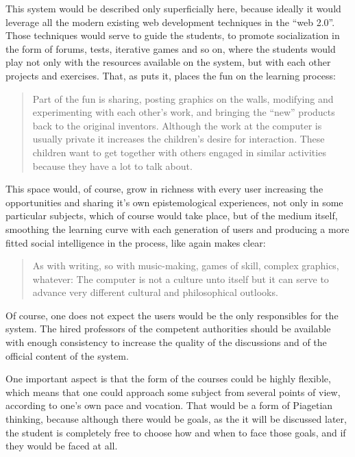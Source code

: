 This system would be described only superficially here, because ideally it would
leverage all the modern existing web development techniques in the ``web 2.0''.
Those techniques would serve to guide the students, to promote socialization in
the form of forums, tests, iterative games and so on, where the students would
play not only with the resources available on the system, but with each other
projects and exercises. That, as \cite{education:papert_mindstorms} puts it,
places the fun on the learning process:

\begin{quote} 
    Part of the fun is sharing, posting graphics on the walls, modifying and
    experimenting with each other's work, and bringing the ``new'' products back to
    the original inventors. Although the work at the computer is usually private it
    increases the children's desire for interaction. These children want to get
    together with others engaged in similar activities because they have a lot to
    talk about. 
\end{quote}

This space would, of course, grow in richness with every user increasing the
opportunities and sharing it's own epistemological experiences, not only in some
particular subjects, which of course would take place, but of the medium itself,
smoothing the learning curve with each generation of users and producing a more
fitted social intelligence in the process, like \cite{education:papert_mindstorms}
again makes clear:

\begin{quote}
    As with writing, so with music-making, games of skill, complex graphics,
    whatever: The computer is not a culture unto itself but it can serve to
    advance very different cultural and philosophical outlooks.
\end{quote}

Of course, one does not expect the users would be the only responsibles for the
system. The hired professors of the competent authorities should be available
with enough consistency to increase the quality of the discussions and of the
official content of the system. 

One important aspect is that the form of the courses could be highly flexible,
which means that one could approach some subject from several points of view,
according to one's own pace and vocation. That would be a form of Piagetian
thinking, because although there would be goals, as the it will be discussed
later, the student is completely free to choose how and when to face those goals,
and if they would be faced at all. 

